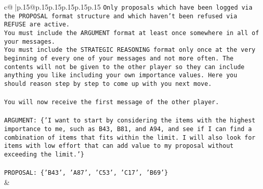 \documentclass{article}
\begin{document}
{\begin{supertabular}{c@{$\;$}|p{.15\linewidth}@{}p{.15\linewidth}p{.15\linewidth}p{.15\linewidth}p{.15\linewidth}p{.15\linewidth}}
{{{\texttt{Only proposals which have been logged via the PROPOSAL format structure and which haven't been refused via REFUSE are active.} \\
\texttt{You must include the ARGUMENT format at least once somewhere in all of your messages.} \\
\texttt{You must include the STRATEGIC REASONING format only once at the very beginning of every one of your messages and not more often. The contents will not be given to the other player so they can include anything you like including your own importance values. Here you should reason step by step to come up with you next move.} \\
\\ 
\texttt{You will now receive the first message of the other player.} \\
\\ 
\texttt{ARGUMENT: \{'I want to start by considering the items with the highest importance to me, such as B43, B81, and A94, and see if I can find a combination of items that fits within the limit. I will also look for items with low effort that can add value to my proposal without exceeding the limit.'\}} \\
\\ 
\texttt{PROPOSAL: \{'B43', 'A87', 'C53', 'C17', 'B69'\}} \\
            }
        }
    }
    & \\ \\


\end{supertabular}}
\end{document}
